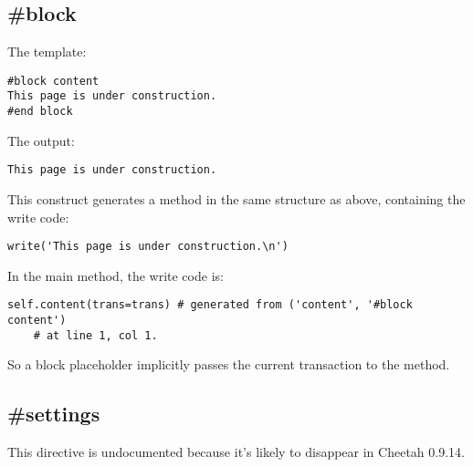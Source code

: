 \subsection{\#block}
\label{inheritanceEtc.block}

The template:
\begin{verbatim}
#block content
This page is under construction.
#end block
\end{verbatim}

The output:
\begin{verbatim}
This page is under construction.
\end{verbatim}

This construct generates a method  in the same structure
as  above, containing the write code:
\begin{verbatim}
write('This page is under construction.\n')
\end{verbatim}

In the main method, the write code is:
\begin{verbatim}
self.content(trans=trans) # generated from ('content', '#block content')
    # at line 1, col 1.
\end{verbatim}

So a block placeholder implicitly passes the current transaction to the method.

\subsection{\#settings}
\label{inheritanceEtc.settings}

This directive is undocumented because it's likely to disappear in Cheetah
0.9.14.




